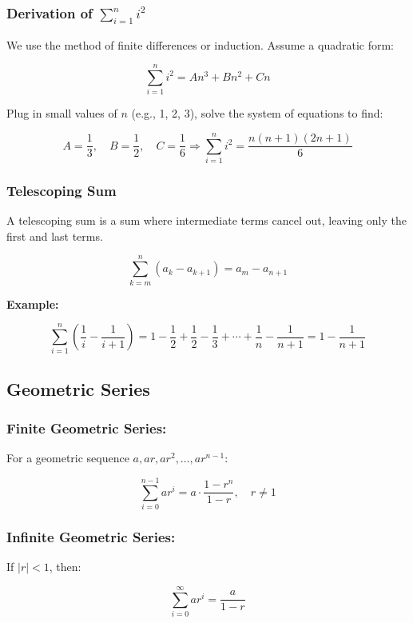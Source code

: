 \subsubsection{Derivation of \texorpdfstring{\(\sum_{i=1}^{n} i^2\)}{∑i²}}

We use the method of finite differences or induction. Assume a quadratic form:

\[
    \sum_{i=1}^{n} i^2 = An^3 + Bn^2 + Cn
\]

Plug in small values of \(n\) (e.g., 1, 2, 3), solve the system of equations to find:

\[
    A = \frac{1}{3}, \quad B = \frac{1}{2}, \quad C = \frac{1}{6}
    \Rightarrow \sum_{i = 1}^{n} i^2 = \frac{n(n+1)(2n+1)}{6}
\]

\subsubsection{Telescoping Sum}

A telescoping sum is a sum where intermediate terms cancel out, leaving only the first and last terms.

\[
    \sum_{k=m}^{n} (a_k - a_{k+1}) = a_m - a_{n+1}
\]


\textbf{Example:}

\[
    \sum_{i=1}^{n} \left( \frac{1}{i} - \frac{1}{i+1} \right)
    = 1 - \frac{1}{2} + \frac{1}{2} - \frac{1}{3} + \cdots + \frac{1}{n} - \frac{1}{n+1}
    = 1 - \frac{1}{n+1}
\]

\subsection{Geometric Series}

\subsubsection{Finite Geometric Series:}

For a geometric sequence \(a, ar, ar^2, \dots, ar^{n-1}\):

\[
    \sum_{i = 0}^{n - 1} ar^i = a \cdot \frac{1 - r^n}{1 - r}, \quad r \ne 1
\]

\subsubsection{Infinite Geometric Series:}

If \(|r| < 1\), then:

\[
    \sum_{i = 0}^{\infty} ar^i = \frac{a}{1 - r}
\]

